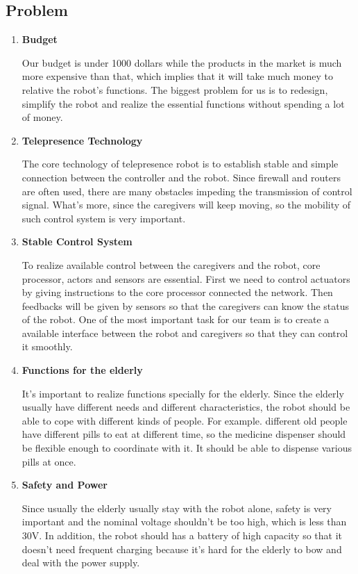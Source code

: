 \documentclass[12pt]{article}
\begin{document}
\subsection{Problem}
\begin{enumerate}[1]
\item \textbf{Budget}
\par Our budget is under 1000 dollars while the products in the market is much more expensive than that, which implies that it will take much money to relative the robot's functions. The biggest problem for us is to redesign, simplify the robot and realize the essential functions without spending a lot of money.
\item \textbf{Telepresence Technology}
\par The core technology of telepresence robot is to establish stable and simple connection between the controller and the robot. Since firewall and routers are often used, there are many obstacles impeding the transmission of control signal. What's more, since the caregivers will keep moving, so the mobility of such control system is very important.
\item \textbf{Stable Control System} 
\par To realize available control between the caregivers and the robot, core processor, actors and sensors are essential. First we need to control actuators by giving instructions to the core processor connected the network. Then feedbacks will be given by sensors so that the caregivers can know the status of the robot. One of the most important task for our team is to create a available interface between the robot and caregivers so that they can control it smoothly.
\item \textbf{Functions for the elderly}
\par It's important to realize functions specially for the elderly. Since the elderly usually have different needs and different characteristics, the robot should be able to cope with different kinds of people. For example. different old people have different pills to eat at different time, so the medicine dispenser should be flexible enough to coordinate with it. It should be able to dispense various pills at once.
\item \textbf{Safety and Power}
\par Since usually the elderly usually stay with the robot alone, safety is very important and the nominal voltage shouldn't be too high, which is less than 30V. In addition, the robot should has a battery of high capacity so that it doesn't need frequent charging because it's hard for the elderly to bow and deal with the power supply.
\end{enumerate}
\end{document}
